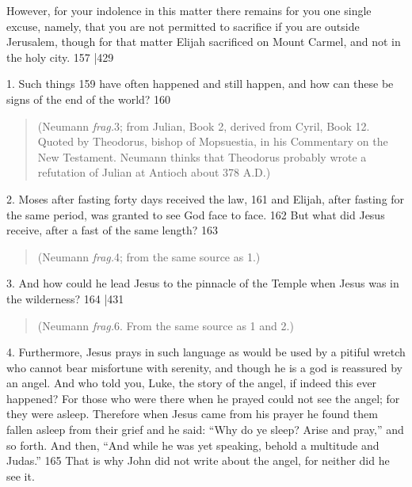 However, for your indolence in this matter there remains for you one single excuse, namely, that you are not permitted to sacrifice if you are outside Jerusalem, though for that matter Elijah sacrificed on Mount Carmel, and not in the holy city. 157
|429


1. Such things 159
have often happened and still happen, and how can these be signs of the end of the world?
160

\begin{quote}

(Neumann \emph{frag.}3; from Julian, Book 2, derived from Cyril, Book 12. Quoted by Theodorus, bishop of Mopsuestia, in his Commentary on the New Testament. Neumann thinks that Theodorus probably wrote a refutation of Julian at Antioch about 378
A.D.)

\end{quote}

2. Moses after fasting forty days received the law, 161
and Elijah, after fasting for the same period, was granted to see God face to face. 162 But what did Jesus receive, after a fast of the same length?
163

\begin{quote}

(Neumann \emph{frag.}4; from the same source as 1.)

\end{quote}

3. And how could he lead Jesus to the pinnacle of the Temple when Jesus was in the wilderness?
164 |431

\begin{quote}

(Neumann \emph{frag.}6. From the same source as 1 and 2.)

\end{quote}

4. Furthermore, Jesus prays in such language as would be used by a pitiful wretch who cannot bear misfortune with serenity, and though he is a god is reassured by an angel. And who told you, Luke, the story of the angel, if indeed this ever happened? For those who were there when he prayed could not see the angel; for they were asleep. Therefore when Jesus came from his prayer he found them fallen asleep from their grief and he said: ``Why do ye sleep? Arise and pray,'' and so forth. And then, ``And while he was yet speaking, behold a multitude and Judas.''
165 \emph{}That is why John did not write about the angel, for neither did he see it.

